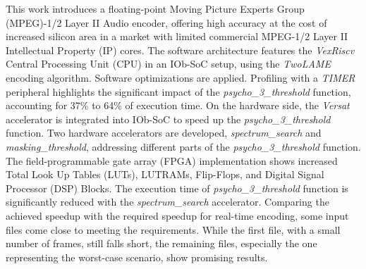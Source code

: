\hspace{0.4cm} This work introduces a floating-point Moving Picture Experts Group (MPEG)-1/2 Layer II Audio encoder, offering high accuracy at the cost of increased silicon area in a market with limited commercial MPEG-1/2 Layer II Intellectual Property (IP) cores.
The software architecture features the \textit{VexRiscv} Central Processing Unit (CPU) in an IOb-SoC setup, using the \textit{TwoLAME} encoding algorithm. Software optimizations are applied. Profiling with a \textit{TIMER} peripheral highlights the significant impact of the \textit{psycho\_3\_threshold} function, accounting for 37\% to 64\% of execution time.
On the hardware side, the \textit{Versat} accelerator is integrated into IOb-SoC to speed up the \textit{psycho\_3\_threshold} function. Two hardware accelerators are developed, \textit{spectrum\_search} and \textit{masking\_threshold}, addressing different parts of the \textit{psycho\_3\_threshold} function. The field-programmable gate array (FPGA) implementation shows increased Total Look Up Tables (LUTs), LUTRAMs, Flip-Flops, and Digital Signal Processor (DSP) Blocks.
The execution time of \textit{psycho\_3\_threshold} function is significantly reduced with the \textit{spectrum\_search} accelerator.
Comparing the achieved speedup with the required speedup for real-time encoding, some input files come close to meeting the requirements. While the first file, with a small number of frames, still falls short, the remaining files, especially the one representing the worst-case scenario, show promising results.
